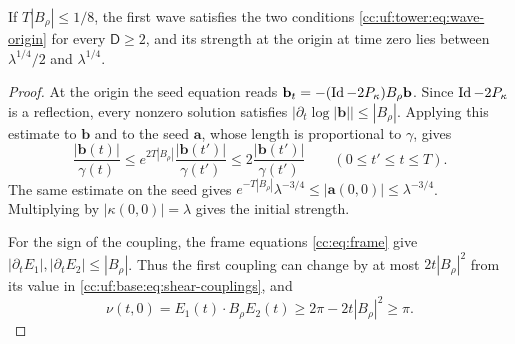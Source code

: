 \begin{lemma}\label{cc:uf:base:lem:first}
If $T|B_\rho|\le1/8$, the first wave satisfies the two conditions
\eqref{cc:uf:tower:eq:wave-origin} for every $\mathsf D\ge2$, and its
strength at the origin at time zero lies between $\lambda^{1/4}/2$ and
$\lambda^{1/4}$.
\end{lemma}
\begin{proof}
At the origin the seed equation reads
$\mathbf b_t=-(\operatorname{Id}-2P_\kappa)B_\rho\mathbf b$. Since $\operatorname{Id}-2P_\kappa$
is a reflection, every nonzero solution satisfies
$\bigl|\partial_t\log|\mathbf b|\bigr|\le|B_\rho|$. Applying this estimate
to $\mathbf b$ and to the seed $\mathbf a$, whose length is proportional
to $\gamma$, gives
\[
 \frac{|\mathbf b(t)|}{\gamma(t)}
 \le e^{2T|B_\rho|}\frac{|\mathbf b(t')|}{\gamma(t')}
 \le 2\frac{|\mathbf b(t')|}{\gamma(t')}\qquad(0\le t'\le t\le T).
\]
The same estimate on the seed gives
$e^{-T|B_\rho|}\lambda^{-3/4}\le|\mathbf a(0,0)|\le\lambda^{-3/4}$.
Multiplying by $|\kappa(0,0)|=\lambda$ gives the initial strength.

For the sign of the coupling, the frame equations \eqref{cc:eq:frame}
give $|\partial_tE_1|,|\partial_tE_2|\le|B_\rho|$. Thus the first coupling
can change by at most $2t|B_\rho|^2$ from its value in
\eqref{cc:uf:base:eq:shear-couplings}, and
\[
 \nu(t,0)=E_1(t)\cdot B_\rho E_2(t)\ge 2\pi-2t|B_\rho|^2\ge\pi .
\]
\end{proof}
